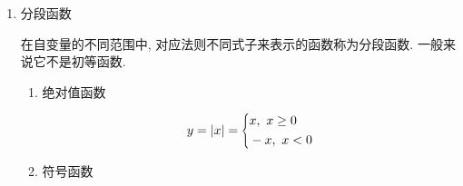 \begin{enumerate}
\begin{enumerate}
\begin{enumerate}
\begin{enumerate}
\begin{figure}[H]
\end{figure}
\item 反正切函数和反余切函数\par
反正切函数$ y=\arctan x $, 反余切函数$ y=\arccot x $
\begin{figure}[H]
\centering
\begin{subfigure}{.475\linewidth}
\centering
{}
\caption{反正切函数图像}
\end{subfigure}
\begin{subfigure}{.475\linewidth}
\caption{反余切函数图像}
\end{subfigure}
\end{figure}
\end{enumerate}
\item 初等函数\par
由基本初等函数经过有限次的四则运算, 以及有限次的复合所构成的可以用一个式子表示的函数称为初等函数.
\end{enumerate}
\item 分段函数\par
在自变量的不同范围中, 对应法则不同式子来表示的函数称为分段函数. 一般来说它不是初等函数.
\begin{enumerate}
\item 绝对值函数\par
\begin{equation*}
y=|x|=
\scaleleftright[6pt]{\biggl\{}{
\begin{aligned}
& x,\ x\ge 0 \\
& -x,\ x<0
\end{aligned}
}{.}
\end{equation*}
\item 符号函数\par

\end{enumerate}
\end{enumerate}
\end{enumerate}
